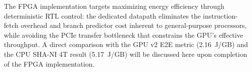 \documentclass[conference]{IEEEtran}
\begin{document}
The FPGA implementation targets maximizing energy efficiency through
deterministic RTL control: the dedicated datapath eliminates the
instruction-fetch overhead and branch predictor cost inherent to
general-purpose processors, while avoiding the PCIe transfer bottleneck
that constrains the GPU's effective throughput.
A direct comparison with the GPU v2 E2E metric (2.16~J/GB) and the
CPU SHA-NI 4T result (5.17~J/GB) will be discussed here upon
completion of the FPGA implementation.




\vspace{12pt}
\end{document}
